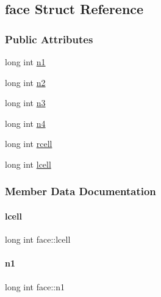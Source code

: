 \hypertarget{structface}{}\subsection{face Struct Reference}
\label{structface}
\subsubsection*{Public Attributes}
\begin{DoxyCompactItemize}
\item 
long int \hyperlink{structface_aa084e68f3850434a5d3229c25b1ea2b9}{n1}
\item 
long int \hyperlink{structface_a795d02e5f8e76860590ce5552fe53671}{n2}
\item 
long int \hyperlink{structface_a977e1dabf4dbd20912cebeb8b34dd21e}{n3}
\item 
long int \hyperlink{structface_a1470972e9d910a99e760f0dedf794eb0}{n4}
\item 
long int \hyperlink{structface_aa041b5f2bac2fb196c7e6722c2b4bb51}{rcell}
\item 
long int \hyperlink{structface_a4f4de6551079c940acfa2678cec218b4}{lcell}
\end{DoxyCompactItemize}


\subsubsection{Member Data Documentation}
\mbox{\label{structface_a4f4de6551079c940acfa2678cec218b4}} 
\paragraph{\texorpdfstring{lcell}{lcell}}
{\footnotesize\ttfamily long int face\+::lcell}

\mbox{\label{structface_aa084e68f3850434a5d3229c25b1ea2b9}} 
\paragraph{\texorpdfstring{n1}{n1}}
{\footnotesize\ttfamily long int face\+::n1}

\mbox{\label{structface_a795d02e5f8e76860590ce5552fe53671}} 
